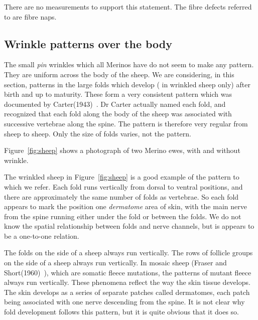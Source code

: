 \documentclass[titlepage]{article}  %
\begin{document}
There are no measurements to support this statement. The fibre defects referred to are fibre naps. 

\subsection{Wrinkle patterns over the body}
\label{sec:pattern}
The small {\em pin} wrinkles which all Merinos have do not seem to make any pattern. They are uniform across the body of the sheep. We are considering, in this section, patterns in the large folds which develop ( in wrinkled sheep only) after birth and up to maturity. These form a very consistent pattern which was documented by Carter(1943)~\cite{cart:43}. Dr Carter actually named each fold, and recognized that each fold along the body of the sheep was associated with successive vertebrae along the spine. The pattern is therefore very regular from sheep to sheep. Only the size of folds varies, not the pattern.

Figure~\ref{fig:sheep} shows a photograph of two Merino ewes, with and without wrinkle. 

The wrinkled sheep in Figure~\ref{fig:sheep} is a good example of the pattern to which we refer.  Each fold runs vertically from dorsal to ventral positions, and there are approximately the same number of folds as vertebrae. So each fold appears to mark the position one {\em dermatome} area of skin, with the main nerve from the spine running either under the fold or between the folds. We do not know the spatial relationship between folds and nerve channels, but is appears to be a one-to-one relation.

The folds on the side of a sheep always run vertically. The rows of follicle groups on the side of a sheep always run vertically. In mosaic sheep (Fraser and Short(1960)~\cite{fras:60}), which are somatic fleece mutations, the patterns of mutant fleece always run vertically.  These phenomena reflect the way the skin tissue develops. The skin develops as a series of separate patches called dermatomes, each patch being associated with one nerve descending from the spine. It is not clear why fold development follows this pattern, but it is quite obvious that it does so.

\clearpage
\end{document}
